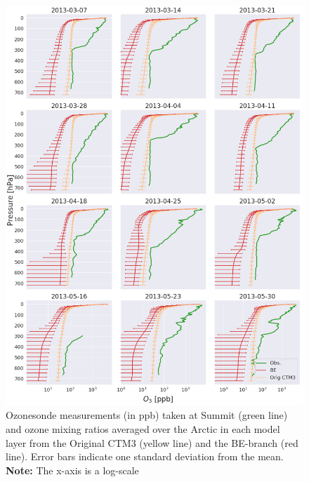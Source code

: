 \begin{figure}[h]
    \centering
    \includegraphics[width = \linewidth]{Chapter6_Results/images/ozone_stationComp_2013/OZONOSONDE_2013.png}
    \caption{Ozonesonde measurements (in ppb) taken at Summit (green line) and ozone mixing ratios averaged over the Arctic in each model layer from the Original CTM3 (yellow line) and the BE-branch (red line). Error bars indicate one standard deviation from the mean. \textbf{Note:} The x-axis is a log-scale}
    \label{fig:ozonosonde2013}
\end{figure}